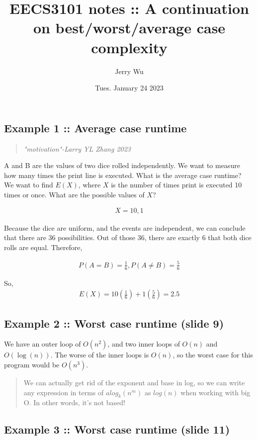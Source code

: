 \documentclass[12pt]{article}
\title{EECS3101 notes :: A continuation on best/worst/average case complexity}
\author{Jerry Wu}
\date{Tues. January 24 2023}
\begin{document}
\maketitle
\subsection*{Example 1 :: Average case runtime}
\begin{quote}
    \textit{"motivation"-Larry YL Zhang 2023}
\end{quote}

A and B are the values of two dice rolled independently. We want to measure how many times the print line is executed. What is the average case runtime?\\

We want to find $E(X)$, where $X$ is the number of times print is executed 10 times or once. What are the possible values of $X$?

\begin{align*}
    X=10,1
\end{align*}

Because the dice are uniform, and the events are independent, we can conclude that there are 36 possibilities. Out of those 36, there are exactly 6 that both dice rolls are equal. Therefore,

\begin{align*}
    P(A=B)=\frac{1}{6}, P(A\neq B)=\frac{5}{6}
\end{align*}

So, \begin{align*}E(X)=10(\frac{1}{6})+1(\frac{5}{6})=2.5\end{align*}


\subsection*{Example 2 :: Worst case runtime (slide 9)}

We have an outer loop of $O(n^2)$, and two inner loops of $O(n)$ and $O(\log(n))$. The worse of the inner loops is $O(n)$, so the worst case for this program would be $O(n^3)$.
\begin{quote}
    We can actually get rid of the exponent and base in log, so we can write any expression in terms of $alog_k(n^m)$ as $log(n)$ when working with big O. In other words, it's not based!
\end{quote}

\subsection*{Example 3 :: Worst case runtime (slide 11)}
\end{document}
